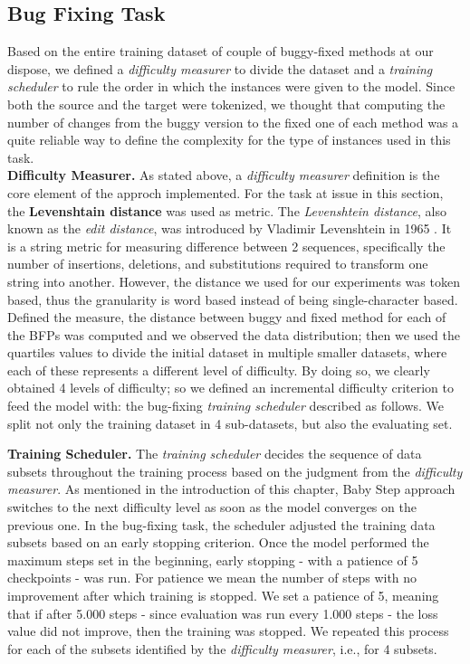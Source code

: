 \subsection{Bug Fixing Task}
Based on the entire training dataset of couple of buggy-fixed methods at our dispose, we defined a \textit{difficulty measurer} to divide the dataset
and a \textit{training scheduler} to rule the order in which the instances were given to the model. Since both the source and the target
were tokenized, we thought that computing the number of changes from the buggy version to the fixed one of each method was a quite reliable
way to define the complexity for the type of instances used in this task.\\
\newline
\textbf{Difficulty Measurer.} As stated above, a \textit{difficulty measurer} definition is the core element of the approch implemented.
For the task at issue in this section, the \textbf{Levenshtain distance} was used as metric. The \textit{Levenshtein distance}, also known as the \textit{edit distance}, 
was introduced by Vladimir Levenshtein in 1965 \cite{Levenshtein_SPD66}. It is a string metric for measuring difference between 2 sequences, specifically the number of insertions, deletions, and substitutions
required to transform one string into another. However, the distance we used for our experiments was token based, thus the granularity is word based instead of being single-character based.\\
Defined the measure, the distance between buggy and fixed method for each of the BFPs was computed and we observed the data distribution; then we used the quartiles values to divide the initial dataset in multiple
smaller datasets, where each of these represents a different level of difficulty.
By doing so, we clearly obtained 4 levels of difficulty; so we defined an incremental difficulty criterion to feed the model with: 
the bug-fixing \textit{training scheduler} described as follows. We split not only the training dataset in 4 sub-datasets, but 
also the evaluating set.\newline


\noindent\textbf{Training Scheduler.} The \textit{training scheduler} decides the sequence of data subsets throughout the training process based
on the judgment from the \textit{difficulty measurer}. As mentioned in the introduction of this chapter, Baby Step approach switches to the next difficulty level
as soon as the model converges on the previous one.
In the bug-fixing task, the scheduler adjusted
the training data subsets based on an early stopping criterion. Once the model performed the maximum 
steps set in the beginning, early stopping - with a patience of 5 checkpoints - was run. For 
patience we mean the number of steps with no improvement after which training is stopped. We set 
a patience of 5, meaning that if after 5.000 steps - since evaluation was run every 1.000 steps - the loss value 
did not improve, then the training was stopped. We repeated this process for each of the subsets identified 
by the \textit{difficulty measurer}, i.e., for 4 subsets.


